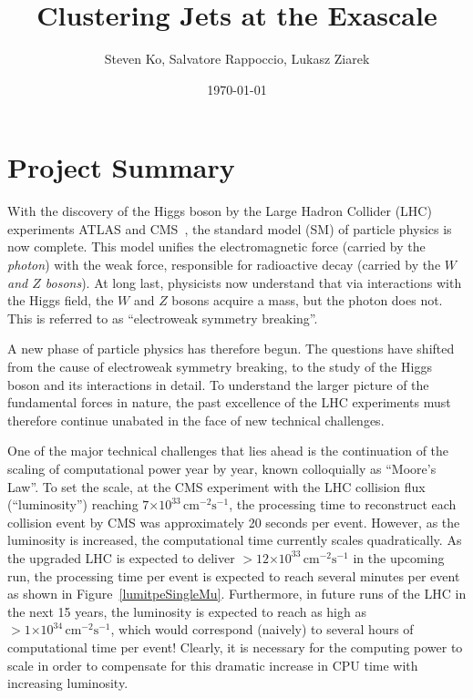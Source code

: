 \documentclass[12pt]{article}
\newcommand{\instlumiA}     {\ensuremath{\times 10^{33} \,\mathrm{cm}^{-2} \mathrm{s}^{-1}}}
\newcommand{\instlumiB}     {\ensuremath{\times 10^{34} \,\mathrm{cm}^{-2} \mathrm{s}^{-1}}}
\begin{document}
\title{Clustering Jets at the Exascale}

\author{Steven Ko, Salvatore Rappoccio, Lukasz Ziarek}

\date{\today}





\maketitle

\section{Project Summary}


With the discovery of the Higgs boson 
by the Large Hadron Collider (LHC)
experiments ATLAS and CMS~\cite{higgs_cms,higgs_atlas}, the
standard model (SM) of particle
physics is now complete. This model unifies the electromagnetic force
(carried by the {\em photon}) with the weak force, responsible for
radioactive decay (carried by the {\em $W$ and $Z$ bosons}).
At long last,
physicists now understand that via interactions with the Higgs field,
the $W$ and $Z$ bosons acquire a mass, but the photon does not. 
This is referred to as ``electroweak symmetry breaking''. 


A new phase of particle physics has therefore begun. 
The questions have shifted from the cause of electroweak symmetry
breaking, to the study of the Higgs boson and its interactions in
detail. 
To understand the larger picture of the fundamental forces in nature,
the past excellence of the LHC experiments must therefore continue
unabated in the face of new technical challenges. 


One of the major technical challenges that lies ahead is the
continuation of the scaling of computational power year by year, known
colloquially as ``Moore's Law''. 
To set the scale, at the CMS experiment
with the LHC collision flux (``luminosity'') reaching
$7\instlumiA$, the processing
time to reconstruct each collision event by CMS was approximately 20
seconds per event. However, as the luminosity is
increased, the computational time currently scales quadratically. As
the upgraded LHC is expected to deliver $>12\instlumiA$ in the
upcoming run, the processing time per event is expected to reach
several minutes per event as shown in
Figure~\ref{lumitpeSingleMu}. Furthermore, in future runs of the LHC
in the next 15 years, the luminosity is expected to reach as high as
$>1\instlumiB$, which would correspond (naively) to several hours of
computational time per event! Clearly, it is necessary for the
computing power to scale in order to compensate for this dramatic
increase in CPU time with increasing luminosity. 
\end{document}
